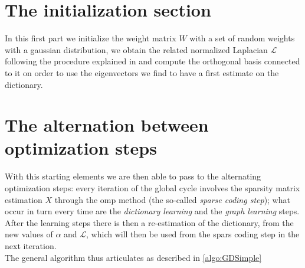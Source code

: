 \section{The initialization section}
In this first part we initialize the weight matrix $W$ with a set of random weights with a gaussian distribution, we obtain the related normalized Laplacian $\mathcal{L}$ following the procedure explained in \cite{Kalofolias2016} and compute the orthogonal basis connected to it on order to use the eigenvectors we find to have a first estimate on the dictionary.

\section{The alternation between optimization steps}
With this starting elements we are then able to pass to the alternating optimization steps: every iteration of the global cycle involves the sparsity matrix estimation $X$ through the \gls{omp} method (the so-called \textit{sparse coding step}); what occur in turn every time are the \textit{dictionary learning} and the \textit{graph learning} steps. After the learning steps there is then a re-estimation of the dictionary, from the new values of $\alpha$ and $\mathcal{L}$, which will then be used from the spars coding step in the next iteration.\\
The general algorithm thus articulates as described in \autoref{algo:GDSimple}

